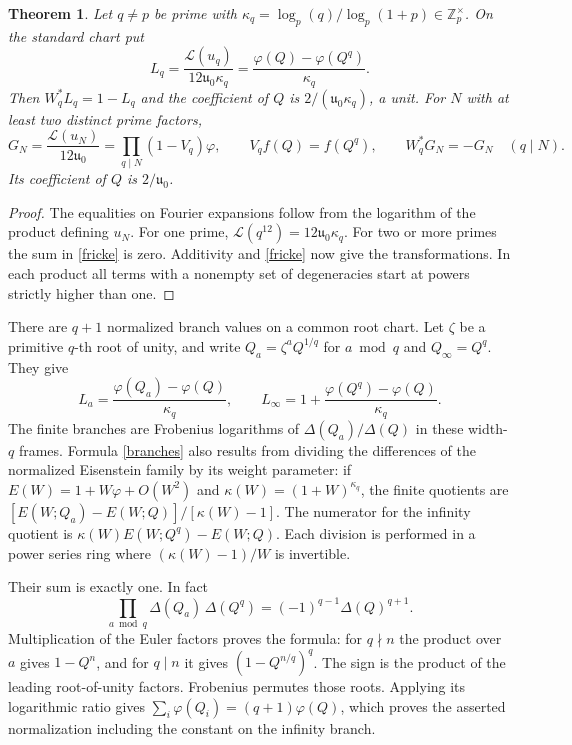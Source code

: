 \documentclass[11pt]{article}
\newtheorem{theorem}{Theorem}[section]\newtheorem{lemma}[theorem]{Lemma}
\newcommand{\Zp}{\mathbb Z_p}
\begin{document}
\begin{theorem}\label{sector}
Let $q\ne p$ be prime with
$\kappa_q=\log_p(q)/\log_p(1+p)\in\Zp^\times$.
On the standard chart put
\[
 L_q=\frac{\mathcal L(u_q)}{12\mathfrak u_0\kappa_q}
       =\frac{\varphi(Q)-\varphi(Q^q)}{\kappa_q}.
\]
Then $W_q^*L_q=1-L_q$ and the coefficient of $Q$ is
$2/(\mathfrak u_0\kappa_q)$, a unit. For $N$ with at least two distinct prime
factors,
\[
 G_N=\frac{\mathcal L(u_N)}{12\mathfrak u_0}
       =\prod_{q\mid N}(1-V_q)\varphi,\qquad V_q f(Q)=f(Q^q),
       \qquad W_q^*G_N=-G_N\quad(q\mid N).
\]
Its coefficient of $Q$ is $2/\mathfrak u_0$.
\end{theorem}
\begin{proof}
The equalities on Fourier expansions follow from the logarithm of
the product defining $u_N$. For one prime,
$\mathcal L(q^{12})=12\mathfrak u_0\kappa_q$. For two or more primes the
sum in \eqref{fricke} is zero. Additivity and \eqref{fricke} now
give the transformations. In each product all terms with a nonempty
set of degeneracies start at powers strictly higher than one.
\end{proof}

There are $q+1$ normalized branch values on a common root chart.
Let $\zeta$ be a primitive $q$-th root of unity, and write
$Q_a=\zeta^a Q^{1/q}$ for $a\bmod q$ and $Q_\infty=Q^q$. They give
\begin{equation}\label{branches}
 L_a=\frac{\varphi(Q_a)-\varphi(Q)}{\kappa_q},\qquad
 L_\infty=1+\frac{\varphi(Q^q)-\varphi(Q)}{\kappa_q}.
\end{equation}
The finite branches are Frobenius logarithms of
$\Delta(Q_a)/\Delta(Q)$ in these width-$q$ frames. Formula
\eqref{branches} also results from dividing the differences of the
normalized Eisenstein family by its weight parameter:
if $E(W)=1+W\varphi+O(W^2)$ and
$\kappa(W)=(1+W)^{\kappa_q}$, the finite quotients are
$[E(W;Q_a)-E(W;Q)]/[\kappa(W)-1]$. The numerator for the infinity
quotient is $\kappa(W)E(W;Q^q)-E(W;Q)$. Each division is performed
in a power series ring where $(\kappa(W)-1)/W$ is invertible.

Their sum is exactly one. In fact
\[
       \prod_{a\bmod q}\Delta(Q_a)\,\Delta(Q^q)
                  =(-1)^{q-1}\Delta(Q)^{q+1}.
\]
Multiplication of the Euler factors proves the formula: for $q\nmid n$
the product over $a$ gives $1-Q^n$, and for $q\mid n$ it gives
$(1-Q^{n/q})^q$. The sign is the product of the leading root-of-unity
factors. Frobenius permutes those roots. Applying its logarithmic
ratio gives $\sum_i\varphi(Q_i)=(q+1)\varphi(Q)$, which proves the asserted
normalization including the constant on the infinity branch.
\end{document}
